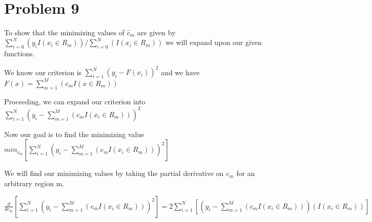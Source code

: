 \documentclass[11pt]{article}
\begin{document}
\begin{center}

\ \\
\end{center}


\section*{Problem 9}

\vspace{5 mm}
\noindent
To show that the minimizing values of $\hat{c}_{m}$ are given by $\sum\limits_{i=0}^N (y_{i} I(x_{i} \in R_{m})) / \sum\limits_{i=0}^N (I(x_{i} \in R_{m}))$ we will expand upon our given functions.

\vspace{3 mm}
\noindent
We know our criterion is $\sum\limits_{i=1}^N (y_{i} - F(x_{i}))^2$ and we have $F(x) = \sum\limits_{m=1}^M (c_{m}I(x \in R_{m}))$

\vspace{3 mm}
\noindent
Proceeding, we can expand our criterion into $\sum\limits_{i=1}^N (y_{i} - \sum\limits_{m=1}^M (c_{m}I(x_{i} \in R_{m})))^2$

\vspace{3 mm}
\noindent
Now our goal is to find the minimizing value $min_{c_{m}}[\sum\limits_{i=1}^N (y_{i} - \sum\limits_{m=1}^M (c_{m}I(x_{i} \in R_{m})))^2]$ 

\vspace{3 mm}
\noindent
We will find our minimizing values by taking the partial derivative on $c_{m}$ for an arbitrary region m.

\vspace{3 mm}
\noindent
$\frac{d}{dc_{m}}[\sum\limits_{i=1}^N (y_{i} - \sum\limits_{m=1}^M (c_{m}I(x_{i} \in R_{m})))^2] = 2\sum\limits_{i=1}^N [(y_{i} - \sum\limits_{m=1}^M (c_{m}I(x_{i} \in R_{m})))(I(x_{i} \in R_{m}))]$ 
\end{document}
